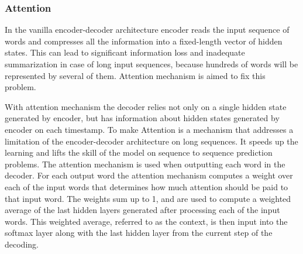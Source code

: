 %	


\subsubsection{Attention} \label{attention}
In the vanilla encoder-decoder architecture encoder reads the input sequence of words and compresses all the information into a fixed-length vector of hidden states. This can lead to significant information loss and inadequate summarization in case of long input sequences, because hundreds of words will be represented by several of them. Attention mechanism is aimed to fix this problem.

With attention mechanism the decoder relies not only on a single hidden state generated by encoder, but has information about hidden states generated by encoder on each timestamp. To make 
Attention is a mechanism that addresses a limitation of the encoder-decoder architecture on long sequences. It speeds up the learning and lifts the skill of the model on sequence to sequence prediction problems. 
The attention mechanism is used when outputting each word in the decoder. For each output word the attention mechanism computes a weight over each of the input
words that determines how much attention should be paid to that input word. The weights sum up to 1, and are used to compute a weighted average of the last hidden layers generated after processing
each of the input words. This weighted average, referred to as the context, is then input into the
softmax layer along with the last hidden layer from the current step of the decoding.



